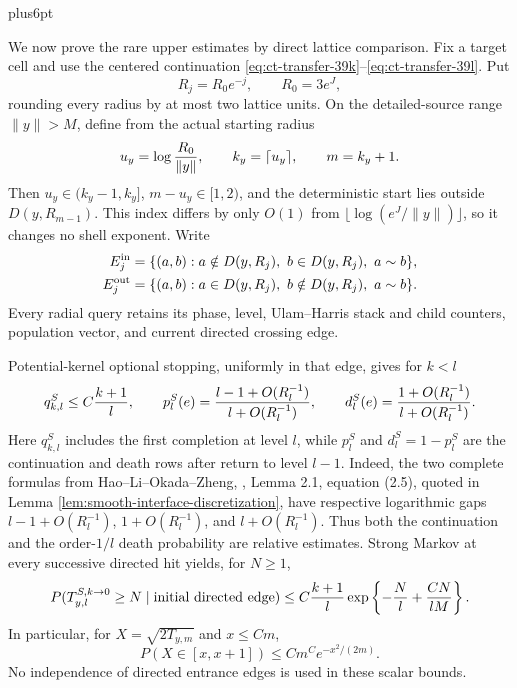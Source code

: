 \documentclass[12pt,reqno]{amsart}
\makeatletter
\theoremstyle{plain}
\theoremstyle{definition}
\theoremstyle{remark}
\renewenvironment{proof}[1][\proofname]{%
  \par
  \pushQED{\qed}%
  \normalfont
  \topsep6pt plus6pt\relax
  \trivlist
  \item[\hskip\labelsep\slshape #1\@addpunct{.}]%
  \ignorespaces
}{%
  \popQED
  \endtrivlist
  \@endpefalse
}
\DeclareRobustCommand{\qed}{%
  \leavevmode\unskip\penalty9999\hbox{}\nobreak
  \ifmmode
    \makebox[0pt][l]{\qquad\hbox{\qedsymbol}}%
  \else
    \qquad\hbox{\qedsymbol}%
  \fi
}
\renewcommand{\qedsymbol}{\rule[.47pt]{4pt}{6pt}}
\numberwithin{equation}{section}
\makeatother
\begin{document}
\begin{proof}[Proof of Lemma~\ref{lem:buffered-transfer}]
We now prove the rare upper estimates by direct lattice comparison.  Fix a target cell
and use the centered continuation \eqref{eq:ct-transfer-39k}--\eqref{eq:ct-transfer-39l}.  Put
\[
R_j=R_0e^{-j},\qquad R_0=3e^J,
\]
rounding every radius by at most two lattice units.  On the detailed-source
range $\|y\|>M$, define from the actual starting radius
\begin{equation}
u_y=\log {R_0\over\|y\|},\qquad
 k_y=\lceil u_y\rceil,\qquad m=k_y+1.\label{eq:ct-transfer-45a0}
\end{equation}
Then $u_y\in(k_y-1,k_y]$, $m-u_y\in[1,2)$, and the
deterministic start lies outside $D(y,R_{m-1})$.  This index differs by
only $O(1)$ from $\lfloor\log(e^J/\|y\|)\rfloor$, so it changes no
shell exponent.  Write
\begin{equation}
\begin{split}
 E_j^{\rm in}&=\{(a,b):a\notin D(y,R_j),\ b\in D(y,R_j),\ a\sim b\},\\
 E_j^{\rm out}&=\{(a,b):a\in D(y,R_j),\ b\notin D(y,R_j),\ a\sim b\}.
\end{split}\label{eq:ct-transfer-45a1}
\end{equation}
Every radial query retains its phase, level, Ulam--Harris stack and child
counters, population vector, and current directed crossing edge.

Potential-kernel optional stopping, uniformly in that edge, gives for
$k<l$
\begin{equation}
q^S_{k,l}\le C{k+1\over l},\qquad
 p_l^S(e)={l-1+O(R_l^{-1})\over l+O(R_l^{-1})},\qquad
 d_l^S(e)={1+O(R_l^{-1})\over l+O(R_l^{-1})}.\label{eq:ct-transfer-45a}
\end{equation}
Here $q^S_{k,l}$ includes the first completion at level $l$, while
$p_l^S$ and $d_l^S=1-p_l^S$ are the continuation and death rows
after return to level $l-1$.  Indeed, the two complete formulas from
Hao--Li--Okada--Zheng, \cite{HLOZ2025}, Lemma 2.1, equation (2.5), quoted in
Lemma \ref{lem:smooth-interface-discretization}, have respective logarithmic
gaps $l-1+O(R_l^{-1})$, $1+O(R_l^{-1})$, and
$l+O(R_l^{-1})$.  Thus both the continuation and the order-$1/l$
death probability are relative estimates.  Strong Markov at every
successive directed hit yields, for $N\ge1$,
\begin{equation}
P(T_{y,l}^{S,k\to0}\ge N\mid\hbox{initial directed edge})
 \le C{k+1\over l}\exp\left\{-{N\over l}+{CN\over lM}\right\}.\label{eq:ct-transfer-45b}
\end{equation}
In particular, for $X=\sqrt{2T_{y,m}}$ and $x\le Cm$,
\begin{equation}
P(X\in[x,x+1])
       \le Cm^C e^{-x^2/(2m)}.\label{eq:ct-transfer-45c}
\end{equation}
No independence of directed entrance edges is used in these scalar bounds.


\end{proof}
\end{document}
